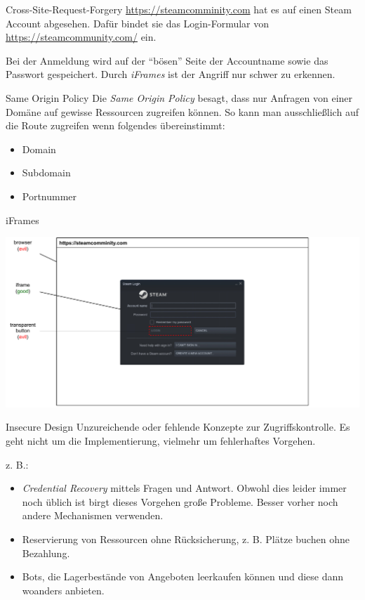 \begin{example}{Cross-Site-Request-Forgery}
    \url{https://steamcomminity.com} hat es auf einen Steam Account abgesehen.
    Dafür bindet sie das Login-Formular von \url{https://steamcommunity.com/} ein.

    Bei der Anmeldung wird auf der \enquote{bösen} Seite der Accountname sowie das Passwort gespeichert.
    Durch \emph{iFrames} ist der Angriff nur schwer zu erkennen.
\end{example}

\begin{defi}{Same Origin Policy}
    Die \emph{Same Origin Policy} besagt, dass nur Anfragen von einer Domäne auf gewisse Ressourcen zugreifen können.
    So kann man ausschließlich auf die Route zugreifen wenn folgendes übereinstimmt:
    \begin{itemize}
        \item Domain
        \item Subdomain
        \item Portnummer
    \end{itemize}
\end{defi}

\begin{example}{iFrames}
    \begin{center}
        \includegraphics[width=\textwidth]{includes/figures/example_iframes.pdf}
    \end{center}
\end{example}

\begin{defi}{Insecure Design}
    Unzureichende oder fehlende Konzepte zur Zugriffskontrolle.
    Es geht nicht um die Implementierung, vielmehr um fehlerhaftes Vorgehen.

    z. B.:
    \begin{itemize}
        \item \emph{Credential Recovery} mittels Fragen und Antwort.
              Obwohl dies leider immer noch üblich ist birgt dieses Vorgehen große Probleme.
              Besser vorher noch andere Mechanismen verwenden.
        \item Reservierung von Ressourcen ohne Rücksicherung, z. B. Plätze buchen ohne Bezahlung.
        \item Bots, die Lagerbestände von Angeboten leerkaufen können und diese dann woanders anbieten.
    \end{itemize}
\end{defi}

